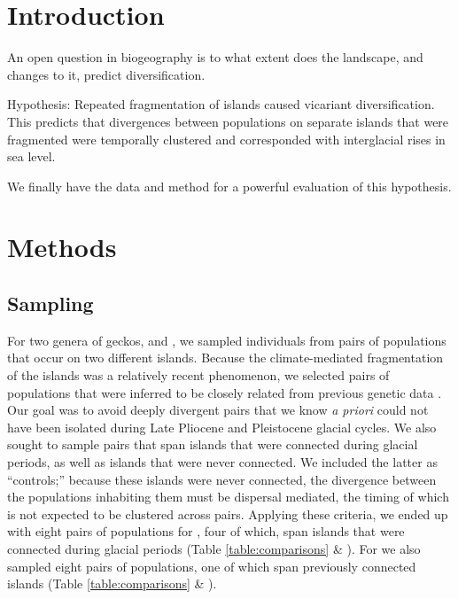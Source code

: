 \section{Introduction}

An open question in biogeography is to what extent does the landscape, and
changes to it, predict diversification.

Hypothesis: Repeated fragmentation of islands caused vicariant diversification.
This predicts that divergences between populations on separate islands that
were fragmented were temporally clustered and corresponded with interglacial
rises in sea level.

We finally have the data and method for a powerful evaluation of this
hypothesis.


\section{Methods}

\subsection{Sampling}
For two genera of geckos,  and , we sampled
individuals from pairs of populations that occur on two different islands.
Because the climate-mediated fragmentation of the islands was a relatively
recent phenomenon, we selected pairs of populations that were inferred to be
closely related from previous genetic data \citep{Siler2012, Siler2014kikuchii,
    Welton2010, Welton2010zootaxa, Siler2010}.
Our goal was to avoid deeply divergent pairs that we know \emph{a priori} could
not have been isolated during Late Pliocene and Pleistocene glacial cycles.
We also sought to sample pairs that span islands that were connected during
glacial periods, as well as islands that were never connected.
We included the latter as ``controls;'' because these islands were never
connected, the divergence between the populations inhabiting them must be
dispersal mediated, the timing of which is not expected to be clustered across
pairs.
Applying these criteria, we ended up with eight pairs of populations for
, four of which, span islands that were connected during
glacial periods (Table \ref{table:comparisons} \& ).
For  we also sampled eight pairs of populations, one of which span
previously connected islands (Table \ref{table:comparisons} \& ).


